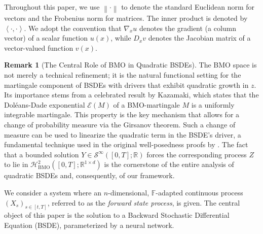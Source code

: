 \documentclass[qian]{imsart}
\newcommand{\R}{\mathbb{R}}
\newcommand{\norm}[1]{\left\lVert#1\right\rVert}
\newcommand{\scpr}[2]{\left\langle #1, #2 \right\rangle}
\theoremstyle{plain}
\theoremstyle{definition}
\newtheorem{remark}[theorem]{Remark}
\begin{document}
Throughout this paper, we use $\norm{\cdot}$ to denote the standard Euclidean norm for vectors and the Frobenius norm for matrices. The inner product is denoted by $\scpr{\cdot}{\cdot}$. We adopt the convention that $\nabla_x u$ denotes the gradient (a column vector) of a scalar function $u(x)$, while $D_x v$ denotes the Jacobian matrix of a vector-valued function $v(x)$.

\begin{remark}[The Central Role of BMO in Quadratic BSDEs]
\label{rem:bmo_centrality}
The BMO space is not merely a technical refinement; it is the natural functional setting for the martingale component of BSDEs with drivers that exhibit quadratic growth in $z$. Its importance stems from a celebrated result by Kazamaki, which states that the Doléans-Dade exponential $\mathcal{E}(M)$ of a BMO-martingale $M$ is a uniformly integrable martingale. This property is the key mechanism that allows for a change of probability measure via the Girsanov theorem. Such a change of measure can be used to linearize the quadratic term in the BSDE's driver, a fundamental technique used in the original well-posedness proofs by \cite{Kobylanski2000}. The fact that a bounded solution $Y \in \mathcal{S}^\infty([0,T]; \R)$ forces the corresponding process $Z$ to lie in $\mathcal{H}^2_{\mathrm{BMO}}([0,T]; \R^{1 \times d})$ is the cornerstone of the entire analysis of quadratic BSDEs and, consequently, of our framework.
\end{remark}

We consider a system where an $n$-dimensional, $\mathbb{F}$-adapted continuous process $(X_s)_{s \in [t,T]}$, referred to as the \textit{forward state process}, is given. The central object of this paper is the solution to a Backward Stochastic Differential Equation (BSDE), parameterized by a neural network.
\end{document}
